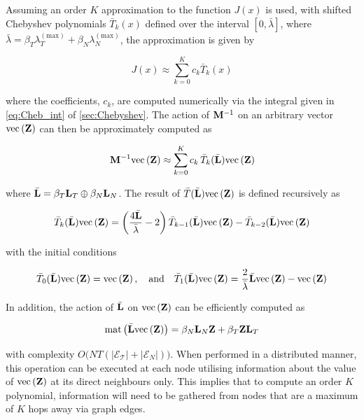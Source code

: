 Assuming an order $K$ approximation to the function $J(x)$ is used, with shifted Chebyshev polynomials ${\bar{T}_k(x)}$ defined over the interval $[0, \bar{\lambda}]$, where $\bar{\lambda} = \beta_T \lambda_T^{(\text{max})} + \beta_N \lambda_N^{(\text{max})}$,  the approximation is given by

\begin{equation}
    J(x) \approx \sum_{k=0}^K c_k \bar{T}_k(x)
\end{equation}

where the coefficients, $c_k$, are computed numerically via the integral given in \cref{eq:Cheb_int} of \cref{sec:Chebyshev}. The action of $\mathbf{M}^{-1}$ on an arbitrary vector $\text{\textup{vec}}\left(\mathbf{Z}\right)$ can then be approximately computed as

\begin{equation}
    \mathbf{M}^{-1} \text{\textup{vec}}\left(\mathbf{Z}\right) \approx \sum_{k=0}^K c_k \, \bar{T}_k(\bar{\mathbf{L}}) \text{\textup{vec}}\left(\mathbf{Z}\right) 
\end{equation}

where $\bar{\mathbf{L}} = \beta_T \mathbf{L}_T \oplus \beta_N \mathbf{L}_N$. The result of $\bar{T}(\bar{\mathbf{L}}) \text{\textup{vec}}\left(\mathbf{Z}\right) $ is defined recursively as 

\begin{equation}
    \bar{T}_k(\bar{\mathbf{L}}) \text{\textup{vec}}\left(\mathbf{Z}\right) = \left(\frac{4 \bar{\mathbf{L}}}{\bar{\lambda}} - 2\right) \bar{T}_{k-1}(\bar{\mathbf{L}}) \text{\textup{vec}}\left(\mathbf{Z}\right) -\bar{T}_{k-2}(\bar{\mathbf{L}}) \text{\textup{vec}}\left(\mathbf{Z}\right)
\end{equation}

with the initial conditions

\begin{equation}
    \bar{T}_0(\bar{\mathbf{L}}) \text{\textup{vec}}\left(\mathbf{Z}\right) = \text{\textup{vec}}\left(\mathbf{Z}\right), \quad \text{and} \quad \bar{T}_1(\bar{\mathbf{L}}) \text{\textup{vec}}\left(\mathbf{Z}\right) = \frac{2}{\bar{\lambda}} \bar{\mathbf{L}} \text{\textup{vec}}\left(\mathbf{Z}\right) - \text{\textup{vec}}\left(\mathbf{Z}\right)
\end{equation}

In addition, the action of $\bar{\mathbf{L}}$ on $\text{\textup{vec}}\left(\mathbf{Z}\right)$ can be efficiently computed as

\begin{equation}
    \text{\textup{mat}}\left(\bar{\mathbf{L}} \text{\textup{vec}}\left(\mathbf{Z}\right)\right) = \beta_N \mathbf{L}_N \mathbf{Z} + \beta_T \mathbf{Z} \mathbf{L}_T 
\end{equation}

with complexity $O\big(NT(|\mathcal{E_T}| + |\mathcal{E}_N|)\big)$. When performed in a distributed manner, this operation can be executed at each node utilising information about the value of $\text{\textup{vec}}\left(\mathbf{Z}\right)$ at its direct neighbours only. This implies that to compute an order $K$ polynomial, information will need to be gathered from nodes that are a maximum of $K$ hops away via graph edges. 

